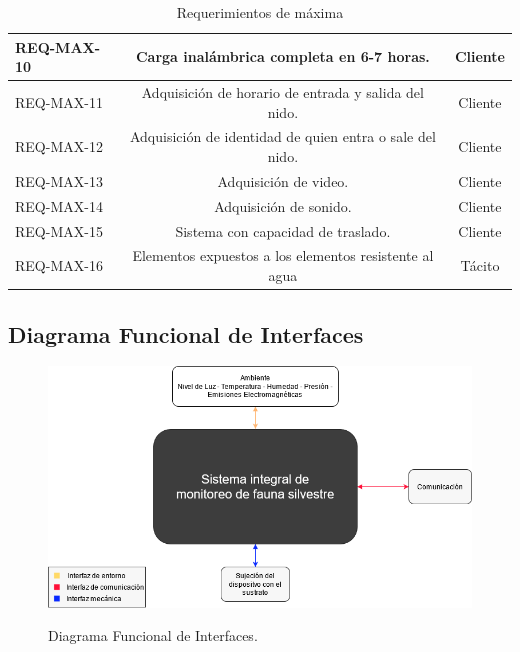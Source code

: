 \begin{table}[]
\begin{tabular}{|l|c|c|}
REQ-MAX-10                        & Carga inalámbrica completa en 6-7 horas.                                                                                             & Cliente         \\ \hline
REQ-MAX-11                        & Adquisición de horario de entrada y salida del nido.                                                                                 & Cliente         \\ \hline
REQ-MAX-12                        & Adquisición de identidad de quien entra o sale del nido.                                                                             & Cliente         \\ \hline
REQ-MAX-13                        & Adquisición de video.                                                                                                                & Cliente         \\ \hline
REQ-MAX-14                        & Adquisición de sonido.                                                                                                               & Cliente         \\ \hline
REQ-MAX-15                        & Sistema con capacidad de traslado.                                                                                                   & Cliente         \\ \hline
REQ-MAX-16                        & Elementos expuestos a los elementos resistente al agua                                                                               & Tácito          \\ \hline
\end{tabular}
\label{tab:req_max}
\caption{Requerimientos de máxima}
\end{table}




\subsection{Diagrama Funcional de Interfaces}

\begin{figure}[H]
	\centering
	\includegraphics[width=\linewidth]{ImagenesDefinicion/func}
	\label{fig:diagrama_func_interfaces}
	\caption{Diagrama Funcional de Interfaces.}
\end{figure}


